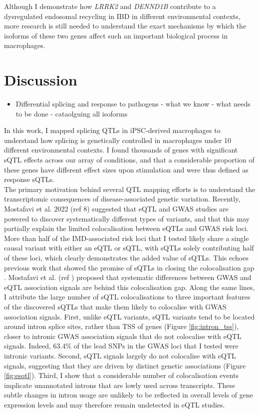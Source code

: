 Although I demonstrate how \textit{LRRK2} and \textit{DENND1B} contribute to a dysregulated endosomal recycling in IBD in different environmental contexts, more research is still needed to understand the exact mechanisms by which the isoforms of these two genes affect such an important biological process in macrophages. \\

\section{Discussion}

\begin{itemize}
  \item Differential splicing and response to pathogens - what we know - what needs to be done - cataolguing all isoforms
\end{itemize}
In this work, I mapped splicing QTLs in iPSC-derived macrophages to understand how splicing is genetically controlled in macrophages under 10 different environmental contexts. I found thousands of genes with significant sQTL effects across our array of conditions, and that a considerable proportion of these genes have different effect sizes upon stimulation and were thus defined as response sQTLs.\\

The primary motivation behind several QTL mapping efforts is to understand the transcriptomic consequences of disease-associated genetic variation. Recently, Mostafavi et al. 2022 (ref 8) suggested that eQTL and GWAS studies are powered to discover systematically different types of variants, and that this may partially explain the limited colocalisation between eQTLs and GWAS risk loci. More than half of the IMD-associated risk loci that I tested likely share a single causal variant with either an eQTL or sQTL, with sQTLs solely contributing half of these loci, which clearly demonstrates the added value of sQTLs. This echoes previous work that showed the promise of sQTLs in closing the colocalisation gap \cite{Mu2021-ar,Kim-Hellmuth2020-gz,Liu2018-fh}. Mostafavi et al. (ref \cite{Mostafavi2022-tg}) proposed that systematic differences between GWAS and eQTL association signals are behind this colocalisation gap. Along the same lines, I attribute the large number of sQTL colocalisations to three important features of the discovered sQTLs that make them likely to colocalise with GWAS association signals. First, unlike eQTL variants, sQTL variants tend to be located around intron splice sites, rather than TSS of genes (Figure \ref{fig:intron_tss}), closer to intronic GWAS association signals that do not colocalise with eQTL signals. Indeed, 63.4\% of the lead SNPs in the GWAS loci that I tested were intronic variants. Second, sQTL signals largely do not colocalise with eQTL signals, suggesting that they are driven by distinct genetic associations (Figure \ref{fig:esqtl}). Third, I show that a considerable number of colocalisation events implicate unannotated introns that are lowly used across transcripts. These subtle changes in intron usage are unlikely to be reflected in overall levels of gene expression levels and may therefore remain undetected in eQTL studies. \\


